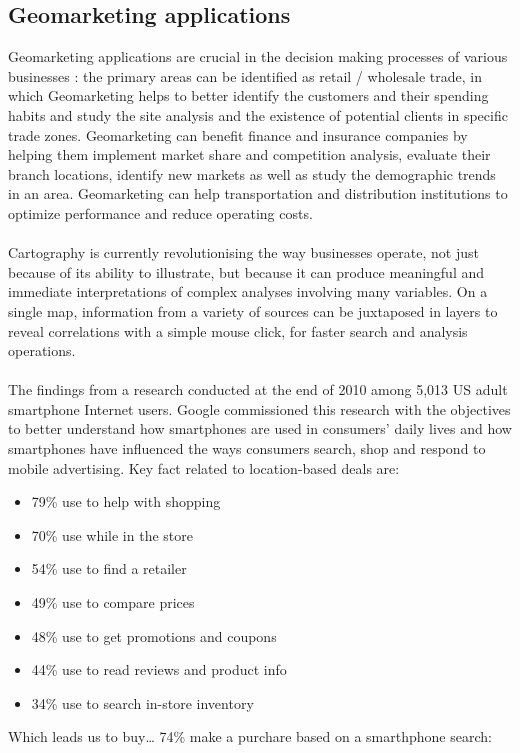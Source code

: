 \subsection{Geomarketing applications}
Geomarketing applications are crucial in the decision making processes of various
businesses : the primary areas can be identified as retail / wholesale trade, in
which Geomarketing helps to better identify the customers and their spending
habits and study the site analysis and the existence of potential clients in
specific trade zones. Geomarketing can benefit finance and insurance companies by
helping them implement market share and competition analysis, evaluate their
branch locations, identify new markets as well as study the demographic trends in
an area. Geomarketing can help transportation and distribution institutions to
optimize performance and reduce operating costs.
\\\\
Cartography is currently revolutionising the way businesses operate, not just
because of its ability to illustrate, but because it can produce meaningful and
immediate interpretations of complex analyses involving many variables. On a
single map, information from a variety of sources can be juxtaposed in layers to
reveal correlations with a simple mouse click, for faster search and analysis
operations.
\\\\
The findings from a research conducted at the end of 2010 among 5,013 US adult
smartphone Internet users. Google commissioned this research with the objectives
to better understand how smartphones are used in consumers’ daily lives and how
smartphones have influenced the ways consumers search, shop and respond to mobile
advertising. Key fact related to location-based deals are:
\begin{itemize}[itemsep=1pt, parsep=1pt]
  \item 79\% use to help with shopping
  \item 70\% use while in the store
  \item 54\% use to find a retailer
  \item 49\% use to compare prices
  \item 48\% use to get promotions and coupons
  \item 44\% use to read reviews and product info
  \item 34\% use to search in-store inventory
\end{itemize}

Which leads us to buy… 74\% make a purchare based on a smarthphone search:

